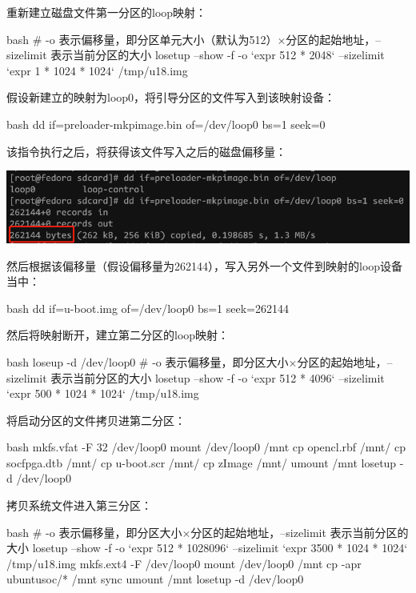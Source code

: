 \begin{outline}[enumerate]
重新建立磁盘文件第一分区的loop映射：
\begin{code-block}{bash}
# -o 表示偏移量，即分区单元大小（默认为512）×分区的起始地址，--sizelimit 表示当前分区的大小
losetup  --show -f -o `expr 512 * 2048` --sizelimit `expr 1 * 1024 * 1024` /tmp/u18.img
\end{code-block}

假设新建立的映射为loop0，将引导分区的文件写入到该映射设备：
\begin{code-block}{bash}
dd if=preloader-mkpimage.bin of=/dev/loop0 bs=1 seek=0
\end{code-block}
该指令执行之后，将获得该文件写入之后的磁盘偏移量：
\par\begin{minipage}{\linewidth}
  \centering
  \includegraphics[width=\linewidth]{loop_offset.png}
  \label{fig:loop_offset}
\end{minipage}
然后根据该偏移量（假设偏移量为262144），写入另外一个文件到映射的loop设备当中：
\begin{code-block}{bash}
dd if=u-boot.img of=/dev/loop0 bs=1 seek=262144
\end{code-block}

然后将映射断开，建立第二分区的loop映射：
\begin{code-block}{bash}
loseup -d /dev/loop0
# -o 表示偏移量，即分区大小×分区的起始地址，--sizelimit 表示当前分区的大小
losetup  --show -f -o `expr 512 * 4096` --sizelimit `expr 500 * 1024 * 1024` /tmp/u18.img
\end{code-block}

将启动分区的文件拷贝进第二分区：
\begin{code-block}{bash}
mkfs.vfat -F 32 /dev/loop0
mount /dev/loop0 /mnt
cp opencl.rbf  /mnt/
cp socfpga.dtb /mnt/
cp u-boot.scr /mnt/
cp zImage /mnt/
umount /mnt
losetup -d /dev/loop0
\end{code-block}

拷贝系统文件进入第三分区：
\begin{code-block}{bash}
# -o 表示偏移量，即分区大小×分区的起始地址，--sizelimit 表示当前分区的大小
losetup  --show -f -o `expr 512 * 1028096` --sizelimit `expr 3500 * 1024 * 1024` /tmp/u18.img
mkfs.ext4 -F /dev/loop0
mount /dev/loop0 /mnt
cp -apr ubuntusoc/* /mnt
sync
umount /mnt
losetup -d /dev/loop0
\end{code-block}


\end{outline}
